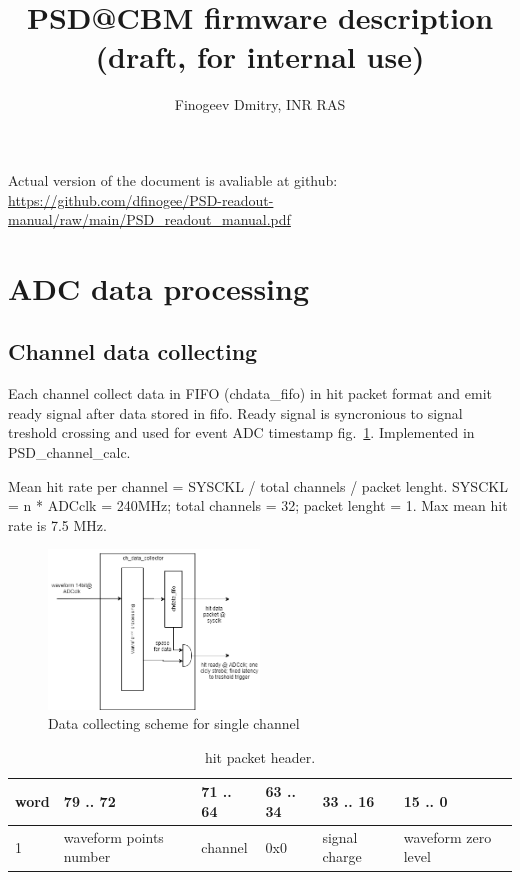 \documentclass{article}
\title{PSD@CBM firmware description (draft, for internal use)}
\author{Finogeev Dmitry, INR RAS}
\begin{document}
\maketitle

Actual version of the document is avaliable at github:
\newline
\url{https://github.com/dfinogee/PSD-readout-manual/raw/main/PSD_readout_manual.pdf}



\tableofcontents

\newpage

\section{ADC data processing}

\subsection{Channel data collecting}
Each channel collect data in FIFO (chdata\_fifo) in hit packet format and emit ready signal after data stored in fifo. Ready signal is syncronious to signal treshold crossing and used for event ADC timestamp fig.~\ref{fig:1}. Implemented in PSD\_channel\_calc.

Mean hit rate per channel = SYSCKL / total channels / packet lenght. SYSCKL = n * ADCclk = 240MHz; total channels = 32; packet lenght = 1. Max mean hit rate is 7.5 MHz.


\begin{figure}[H]
	\centering 
	\includegraphics[width=0.5\textwidth]{ADC_event_collection.png}
	\caption{\label{fig:1} Data collecting scheme for single channel}
\end{figure}

\begin{table}[H]
\centering
\begin{tabular}{| l | l | l | l | l | l |}
\hline
word & 79 .. 72 & 71 .. 64 & 63 .. 34 & 33 .. 16 & 15 .. 0 \\ \hline
1 & waveform points number & channel & 0x0 & signal charge & waveform zero level \\ \hline
\end{tabular}
\caption{hit packet header.\label{tab2}}
\end{table}
\end{document}
